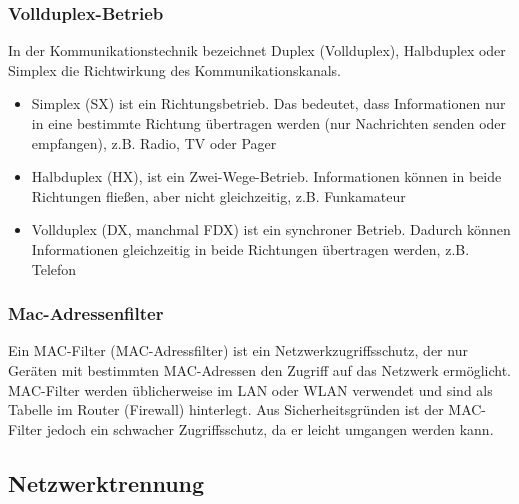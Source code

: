         \subsubsection{Vollduplex-Betrieb}
        In der Kommunikationstechnik bezeichnet Duplex (Vollduplex), Halbduplex oder Simplex die 
        Richtwirkung des Kommunikationskanals.
        \begin{itemize}
            \item Simplex (SX) ist ein Richtungsbetrieb. Das bedeutet, dass Informationen nur in eine bestimmte Richtung übertragen werden (nur Nachrichten senden oder empfangen), z.B. Radio, TV oder Pager
            \item Halbduplex (HX), ist ein Zwei-Wege-Betrieb. Informationen können in beide Richtungen fließen, aber nicht gleichzeitig, z.B. Funkamateur
            \item Vollduplex (DX, manchmal FDX) ist ein synchroner Betrieb. Dadurch können Informationen gleichzeitig in beide Richtungen übertragen werden, z.B. Telefon
        \end{itemize}

        \newpage
        \subsubsection{Mac-Adressenfilter}
        Ein MAC-Filter (MAC-Adressfilter) ist ein Netzwerkzugriffsschutz, 
        der nur Geräten mit bestimmten MAC-Adressen den Zugriff auf das Netzwerk 
        ermöglicht. MAC-Filter werden üblicherweise im LAN oder WLAN verwendet und 
        sind als Tabelle im Router (Firewall) hinterlegt. Aus Sicherheitsgründen ist 
        der MAC-Filter jedoch ein schwacher Zugriffsschutz, da er leicht umgangen werden kann.

    \newpage
    \subsection{Netzwerktrennung}

